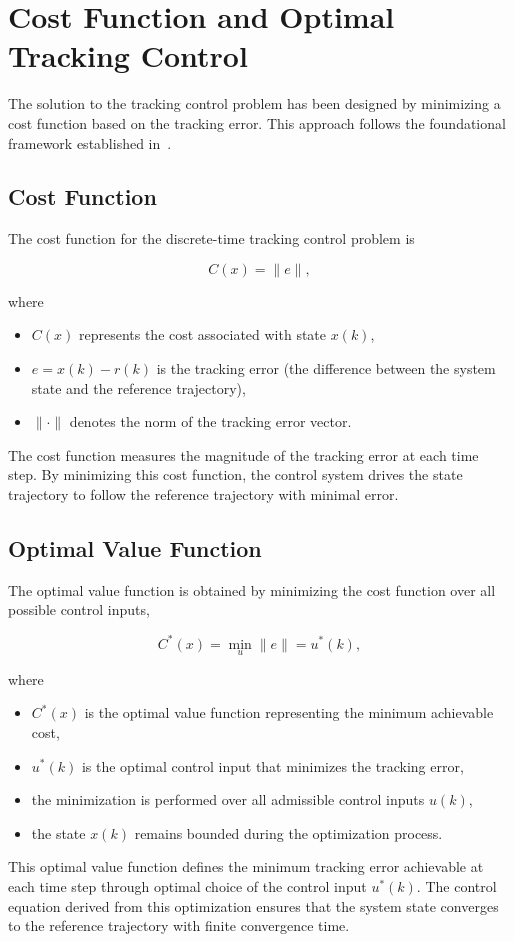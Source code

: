 \section{Cost Function and Optimal Tracking Control}

The solution to the tracking control problem has been designed by minimizing a cost function based on the tracking error. This approach follows the foundational framework established in~\cite{tymoshchuk2024tracking}.

\subsection{Cost Function}

The cost function for the discrete-time tracking control problem is

\begin{equation}
	C(x) = \|e\|,
	\label{eq:cost_function}
\end{equation}

\noindent where

\begin{itemize}
	\item $C(x)$ represents the cost associated with state $x(k)$,
	\item $e = x(k) - r(k)$ is the tracking error (the difference between the system state and the reference trajectory),
	\item $\|\cdot\|$ denotes the norm of the tracking error vector.
\end{itemize}

The cost function measures the magnitude of the tracking error at each time step. By minimizing this cost function, the control system drives the state trajectory to follow the reference trajectory with minimal error.

\subsection{Optimal Value Function}

The optimal value function is obtained by minimizing the cost function over all possible control inputs,

\begin{equation}
	C^*(x) = \min_u \|e\| = u^*(k),
	\label{eq:optimal_value_function}
\end{equation}

\noindent where
\begin{itemize}
	\item $C^*(x)$ is the optimal value function representing the minimum achievable cost,
	\item $u^*(k)$ is the optimal control input that minimizes the tracking error,
	\item the minimization is performed over all admissible control inputs $u(k)$,
	\item the state $x(k)$ remains bounded during the optimization process.
\end{itemize}

This optimal value function defines the minimum tracking error achievable at each time step through optimal choice of the control input $u^*(k)$. The control equation derived from this optimization ensures that the system state converges to the reference trajectory with finite convergence time.
